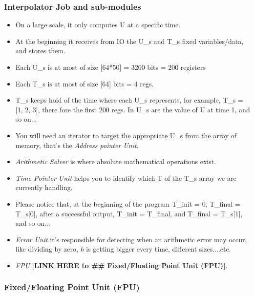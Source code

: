 \documentclass[12pt]{extarticle}
\begin{document}
\subsubsection{Interpolator Job and sub-modules}
\begin{itemize}
    \item On a large scale, it only computes U at a specific time.
    \item At the beginning it receives from IO the U\_s and T\_s fixed variables/data, and stores them.
    \item Each U\_s is at most of size [64*50] = 3200 bits = 200 registers
    \item Each T\_s is at most of size [64] bits = 4 regs.
    \item T\_s keeps hold of the time where each U\_s represents, for example, T\_s = [1, 2, 3], there fore the first 200 regs. In U\_s are the value of U at time 1, and so on... 
    \item You will need an iterator to target the appropriate U\_s from the array of memory, that's the \emph{Address pointer Unit}.
    \item \emph{Arithmetic Solver} is where absolute mathematical operations exist.
    \item \emph{Time Pointer Unit} helps you to identify which T of the T\_s array we are currently handling.
    \item Please notice that, at the beginning of the program T\_init = 0, T\_final = T\_s[0], after a successful output, T\_init = T\_final, and T\_final = T\_s[1], and so on...
    \item \emph{Error Unit} it's responsible for detecting when an arithmetic error may occur, like dividing by zero, \emph{h} is getting bigger every time, different sizes....etc.
    \item \emph{FPU} \textbf{[LINK HERE to \#\# Fixed/Floating Point Unit (FPU)]}.
\end{itemize}

\subsubsection{Fixed/Floating Point Unit (FPU)}
\end{document}
